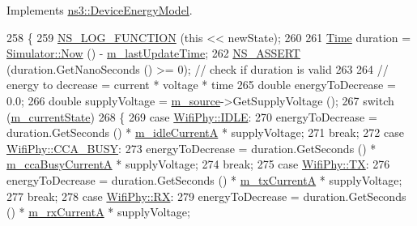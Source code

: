 Implements \hyperlink{classns3_1_1DeviceEnergyModel_a332be7863f3e8258743811077dde7f39}{ns3\+::\+Device\+Energy\+Model}.


\begin{DoxyCode}
258 \{
259   \hyperlink{log-macros-disabled_8h_a90b90d5bad1f39cb1b64923ea94c0761}{NS\_LOG\_FUNCTION} (\textcolor{keyword}{this} << newState);
260 
261   \hyperlink{namespacens3_1_1TracedValueCallback_a7ffd3e7c142ffe7c8a1d2db9b8de38ec}{Time} duration = \hyperlink{classns3_1_1Simulator_ac3178fa975b419f7875e7105be122800}{Simulator::Now} () - \hyperlink{classns3_1_1WifiRadioEnergyModel_a7ac51693b29b679aa09d76a3f78a231d}{m\_lastUpdateTime};
262   \hyperlink{assert_8h_a6dccdb0de9b252f60088ce281c49d052}{NS\_ASSERT} (duration.GetNanoSeconds () >= 0); \textcolor{comment}{// check if duration is valid}
263 
264   \textcolor{comment}{// energy to decrease = current * voltage * time}
265   \textcolor{keywordtype}{double} energyToDecrease = 0.0;
266   \textcolor{keywordtype}{double} supplyVoltage = \hyperlink{classns3_1_1WifiRadioEnergyModel_a4d8a626e91ba3c7b337df91071380d34}{m\_source}->GetSupplyVoltage ();
267   \textcolor{keywordflow}{switch} (\hyperlink{classns3_1_1WifiRadioEnergyModel_a3f7bc986f460d8d987a7104c71c952a4}{m\_currentState})
268     \{
269     \textcolor{keywordflow}{case} \hyperlink{classns3_1_1WifiPhy_af97408fa76f99797497b492758467143ab82b721cfd612ae187d78ffc812c567d}{WifiPhy::IDLE}:
270       energyToDecrease = duration.GetSeconds () * \hyperlink{classns3_1_1WifiRadioEnergyModel_a0d7942dec1faf5c3ecc7c0f908280bc2}{m\_idleCurrentA} * supplyVoltage;
271       \textcolor{keywordflow}{break};
272     \textcolor{keywordflow}{case} \hyperlink{classns3_1_1WifiPhy_af97408fa76f99797497b492758467143aaec7a6711c1e391040d923fc0efcc849}{WifiPhy::CCA\_BUSY}:
273       energyToDecrease = duration.GetSeconds () * \hyperlink{classns3_1_1WifiRadioEnergyModel_a23a8b18e636106cf6655a279de953b08}{m\_ccaBusyCurrentA} * supplyVoltage;
274       \textcolor{keywordflow}{break};
275     \textcolor{keywordflow}{case} \hyperlink{classns3_1_1WifiPhy_af97408fa76f99797497b492758467143a69db14ff4bed82ca0242f8b09065ff09}{WifiPhy::TX}:
276       energyToDecrease = duration.GetSeconds () * \hyperlink{classns3_1_1WifiRadioEnergyModel_a7875a6969770435f031014f41725dea5}{m\_txCurrentA} * supplyVoltage;
277       \textcolor{keywordflow}{break};
278     \textcolor{keywordflow}{case} \hyperlink{classns3_1_1WifiPhy_af97408fa76f99797497b492758467143a7c7899649be8e296e8907e47aacf148e}{WifiPhy::RX}:
279       energyToDecrease = duration.GetSeconds () * \hyperlink{classns3_1_1WifiRadioEnergyModel_ac96a97fe3fd0c6b69cdcc976de440c43}{m\_rxCurrentA} * supplyVoltage;

\end{DoxyCode}
